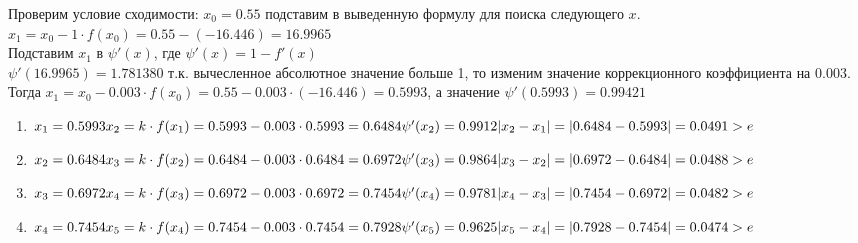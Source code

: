 \documentclass{article}
\begin{document}
Проверим условие сходимости: $x_0 = 0.55$ подставим в выведенную формулу для
поиска следующего $x$.\\
$x_{1} = x_{0} - 1 \cdot f(x_{0}) = 0.55 - (-16.446)= 16.9965$\\
Подставим $x_{1}$ в $\psi'(x)$, где $\psi'(x) = 1 - f'(x)$ \\
$\psi'(16.9965) = 1.781380$  т.к. вычесленное абсолютное значение больше 1, то
изменим значение коррекционного коэффициента на 0.003. Тогда
$x_{1} = x_{0} - 0.003\cdot f(x_{0}) = 0.55 - 0.003 \cdot (-16.446)= 0.5993$, а
значение $\psi'(0.5993) =0.99421$

\begin{enumerate}[label= итерация \arabic{*}:]
  \item
\begin{math}
  x_{1} = 0.5993\\
  x_{2} = k \cdot f(x_{1}) = 0.5993-0.003 \cdot 0.5993=0.6484\\
  \psi'(x_{2}) = 0.9912\\
  |x_{2} - x_{1}| = |0.6484-0.5993| = 0.0491 > e 
\end{math}

\item
\begin{math}
  x_{2} = 0.6484\\
  x_{3} = k \cdot f(x_{2}) = 0.6484-0.003 \cdot 0.6484=0.6972\\
  \psi'(x_{3}) = 0.9864\\
  |x_{3} - x_{2}| = |0.6972-0.6484| = 0.0488 > e 
\end{math}

\item
\begin{math}
  x_{3} = 0.6972\\
  x_{4} = k \cdot f(x_{3}) = 0.6972-0.003 \cdot 0.6972=0.7454\\
  \psi'(x_{4}) = 0.9781\\
  |x_{4} - x_{3}| = |0.7454-0.6972| = 0.0482 > e 
\end{math}

\item
\begin{math}
  x_{4} = 0.7454\\
  x_{5} = k \cdot f(x_{4}) = 0.7454-0.003 \cdot 0.7454=0.7928\\
  \psi'(x_{5}) = 0.9625\\
  |x_{5} - x_{4}| = |0.7928-0.7454| = 0.0474 > e
\end{math}


\end{enumerate}
\end{document}
